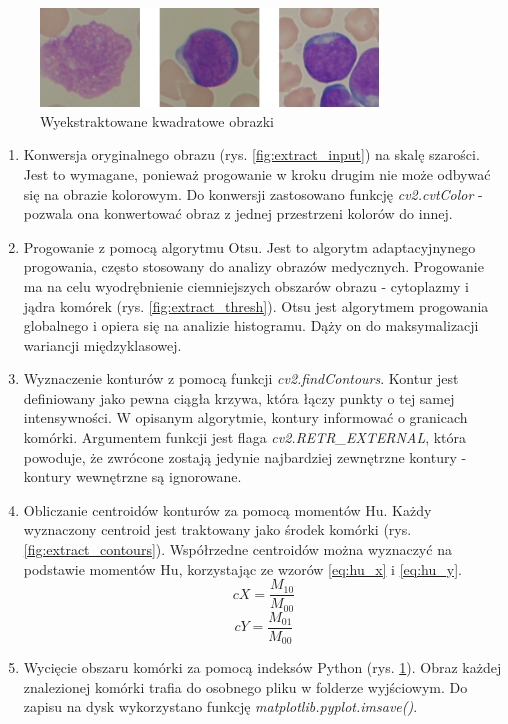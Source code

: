 \begin{figure}
    \centering
    \includegraphics[width=0.8\textwidth]{cells}
    \caption{Wyekstraktowane kwadratowe obrazki}
    \label{fig:extract_squares}
\end{figure}

\begin{enumerate}
    \item Konwersja oryginalnego obrazu (rys. \ref{fig:extract_input}) na skalę szarości.
    Jest to wymagane, ponieważ progowanie w kroku drugim nie może odbywać się na obrazie kolorowym.
    Do konwersji zastosowano funkcję \textit{cv2.cvtColor} - pozwala ona konwertować obraz z jednej przestrzeni kolorów do innej.
    \item Progowanie z pomocą algorytmu Otsu.
    Jest to algorytm adaptacyjnynego progowania, często stosowany do analizy obrazów medycznych.
    Progowanie ma na celu wyodrębnienie ciemniejszych obszarów obrazu - cytoplazmy i jądra komórek (rys. \ref{fig:extract_thresh}). Otsu jest algorytmem progowania globalnego i opiera się na analizie histogramu.
    Dąży on do maksymalizacji wariancji międzyklasowej.
    \item Wyznaczenie konturów z pomocą funkcji \textit{cv2.findContours}. Kontur jest definiowany jako pewna ciągła krzywa, która łączy punkty o tej samej intensywności.
    W opisanym algorytmie, kontury informować o granicach komórki. Argumentem funkcji jest flaga \textit{cv2.RETR\_EXTERNAL}, która powoduje, że zwrócone zostają jedynie najbardziej zewnętrzne kontury - kontury wewnętrzne są ignorowane.
    \item Obliczanie centroidów konturów za pomocą momentów Hu. Każdy wyznaczony centroid jest traktowany jako środek komórki (rys. \ref{fig:extract_contours}). Współrzedne centroidów można wyznaczyć na podstawie momentów Hu, korzystając ze wzorów \ref{eq:hu_x} i \ref{eq:hu_y}.
    \begin{equation}
        cX = \dfrac{M_{10}}{M_{00}}\label{eq:hu_x}
    \end{equation}
    \begin{equation}
        cY = \dfrac{M_{01}}{M_{00}}\label{eq:hu_y}
    \end{equation}
    \item Wycięcie obszaru komórki za pomocą indeksów Python (rys. \ref{fig:extract_squares}). Obraz każdej znalezionej komórki trafia do osobnego pliku w folderze wyjściowym. Do zapisu na dysk wykorzystano funkcję \textit{matplotlib.pyplot.imsave()}.
\end{enumerate}

